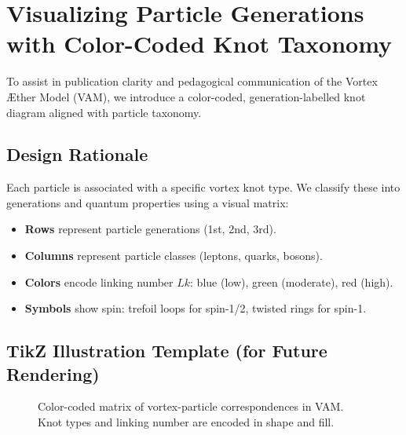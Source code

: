 \usepackage{tikz}\section{Visualizing Particle Generations with Color-Coded Knot Taxonomy}

To assist in publication clarity and pedagogical communication of the Vortex Æther Model (VAM), we introduce a color-coded, generation-labelled knot diagram aligned with particle taxonomy.

\subsection{Design Rationale}

Each particle is associated with a specific vortex knot type. We classify these into generations and quantum properties using a visual matrix:

\begin{itemize}
    \item \textbf{Rows} represent particle generations (1st, 2nd, 3rd).
    \item \textbf{Columns} represent particle classes (leptons, quarks, bosons).
    \item \textbf{Colors} encode linking number $Lk$: blue (low), green (moderate), red (high).
    \item \textbf{Symbols} show spin: trefoil loops for spin-1/2, twisted rings for spin-1.
\end{itemize}

\subsection{TikZ Illustration Template (for Future Rendering)}

\begin{figure}[h!]
    \centering
    \caption{Color-coded matrix of vortex-particle correspondences in VAM. Knot types and linking number are encoded in shape and fill.}
\end{figure}

